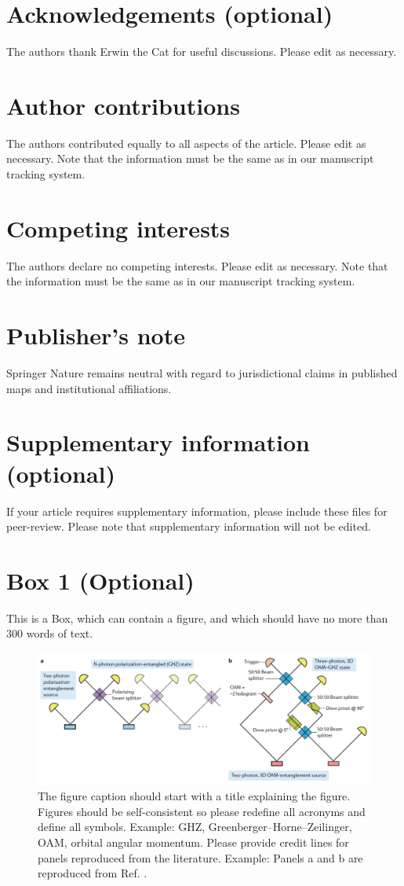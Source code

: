 \documentclass[fleqn,10pt]{wlscirep}
\begin{document}
\section*{Acknowledgements (optional)}
The authors thank Erwin the Cat for useful discussions. Please edit as necessary.

\section*{Author contributions}
The authors contributed equally to all aspects of the article. Please edit as necessary. Note that the information must be the same as in our manuscript tracking system.

\section*{Competing interests}
The authors declare no competing interests. Please edit as necessary. Note that the information must be the same as in our manuscript tracking system.

\section*{Publisher’s note}
Springer Nature remains neutral with regard to jurisdictional claims in published maps and institutional affiliations.

\section*{Supplementary information (optional)}
If your article requires supplementary information, please include these files for peer-review. Please note that supplementary information will not be edited.

\newpage
\section*{Box 1 (Optional)}
This is a Box, which can contain a figure, and which should have no more than 300 words of text.

\begin{figure}[ht]
\centering
\includegraphics[width=\linewidth]{fig}
\caption{The figure caption should start with a title explaining the figure. Figures should be self-consistent so please redefine all acronyms and define all symbols. Example: GHZ, Greenberger–Horne–Zeilinger, OAM, orbital angular momentum. Please provide credit lines for panels reproduced from the literature. Example: Panels a and b are reproduced from Ref. \cite{TR}.}
\label{fig}
\end{figure}
\end{document}
